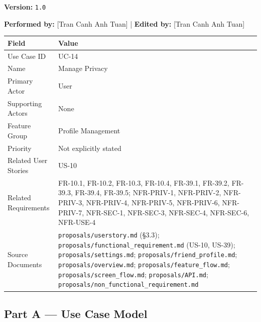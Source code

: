 \documentclass[12pt]{article}
\renewcommand{\baselinestretch}{1.5}
\begin{document}
\textbf{Version:} \texttt{1.0}
\par\medskip

\textbf{Performed by:} [Tran Canh Anh Tuan] | \textbf{Edited by:} [Tran Canh Anh Tuan]
\par\medskip

\begingroup
\small
\renewcommand{\baselinestretch}{1.0}\selectfont
\renewcommand{\arraystretch}{1.15}
\setlength{\tabcolsep}{6pt}
\begin{longtable}{|>{\raggedright\arraybackslash}p{}|>{\raggedright\arraybackslash}p{}|}
\hline
\textbf{Field} & \textbf{Value} \\ \hline
\endhead
Use Case ID & UC-14 \\ \hline
Name & Manage Privacy \\ \hline
Primary Actor & User \\ \hline
Supporting Actors & None \\ \hline
Feature Group & Profile Management \\ \hline
Priority & Not explicitly stated \\ \hline
Related User Stories & US-10 \\ \hline
Related Requirements & FR-10.1, FR-10.2, FR-10.3, FR-10.4, FR-39.1, FR-39.2, FR-39.3, FR-39.4, FR-39.5; NFR-PRIV-1, NFR-PRIV-2, NFR-PRIV-3, NFR-PRIV-4, NFR-PRIV-5, NFR-PRIV-6, NFR-PRIV-7, NFR-SEC-1, NFR-SEC-3, NFR-SEC-4, NFR-SEC-6, NFR-USE-4 \\ \hline
Source Documents & \texttt{proposals/userstory.md} (§3.3); \texttt{proposals/functional\_requirement.md} (US-10, US-39); \texttt{proposals/settings.md}; \texttt{proposals/friend\_profile.md}; \texttt{proposals/overview.md}; \texttt{proposals/feature\_flow.md}; \texttt{proposals/screen\_flow.md}; \texttt{proposals/API.md}; \texttt{proposals/non\_functional\_requirement.md} \\ \hline
\end{longtable}
\endgroup
\par\medskip

\hypertarget{sec:part-a-use-case-model}{}
\subsection*{Part A --- Use Case Model}
\par\medskip

\hypertarget{sec:a1-focused-use-case-diagram}{}
\end{document}
